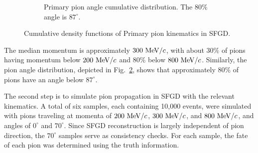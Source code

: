 \begin{figure}[t]
\begin{subfigure}{\dbfigwid\textwidth}
                    \caption{Primary pion angle cumulative distribution. The $80\%$ angle is $87^\circ$.}
                    \label{subfig:pi-theta-cum}
               \end{subfigure}
               \caption{Cumulative density functions of Primary pion kinematics in SFGD.}
          \end{figure}
               
          The median momentum is approximately $300~\textrm{MeV}/c$, with about $30\%$ of pions having momentum below $200~\textrm{MeV}/c$ and $80\%$ below $800~\textrm{MeV}/c$. 
          Similarly, the pion angle distribution, depicted in Fig.~\ref{subfig:pi-theta-cum}, shows that approximately $80\%$ of pions have an angle below $87^\circ$.

          The second step is to simulate pion propagation in SFGD with the relevant kinematics. 
          A total of six samples, each containing 10,000 events, were simulated with pions traveling at momenta of $200~\textrm{MeV}/c$, $300~\textrm{MeV}/c$, and $800~\textrm{MeV}/c$, and angles of $0^\circ$ and $70^\circ$. 
          Since SFGD reconstruction is largely independent of pion direction, the $70^\circ$ samples serve as consistency checks. 
          For each sample, the fate of each pion was determined using the truth information.


